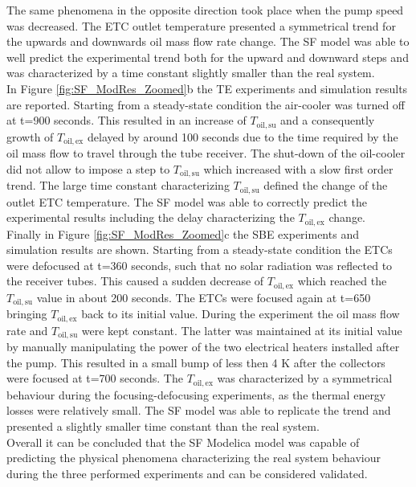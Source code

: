 \documentclass[final,3p,times,review]{elsarticle}
\begin{document}
The same phenomena in the opposite direction took place when the pump speed was decreased. 
The ETC outlet temperature presented a symmetrical trend for the upwards and downwards oil mass flow rate change. The SF model was able to well predict the experimental trend both for the upward and downward steps and was characterized by a time constant slightly smaller than the real system.\\
In Figure \ref{fig:SF_ModRes_Zoomed}b the TE experiments and simulation results are reported. Starting from a steady-state condition the air-cooler was turned off at t=900 seconds. This resulted in an increase of $T_\mathrm{oil,su}$ and a consequently growth of $T_\mathrm{oil,ex}$ delayed by around 100 seconds due to the time required by the oil mass flow to travel through the tube receiver. The shut-down of the oil-cooler did not allow to impose a step to $T_\mathrm{oil,su}$ which increased with a slow first order trend. The large time constant characterizing $T_\mathrm{oil,su}$ defined the change of the outlet ETC temperature. The SF model was able to correctly predict the experimental results including  the delay characterizing the $T_\mathrm{oil,ex}$ change.\\
Finally in Figure \ref{fig:SF_ModRes_Zoomed}c the SBE experiments and simulation results are shown. Starting from a steady-state condition the ETCs were defocused at t=360 seconds, such that no solar radiation was reflected to the receiver tubes. This caused a sudden decrease of $T_\mathrm{oil,ex}$ which reached the $T_\mathrm{oil,su}$ value in about 200 seconds. The ETCs were focused again at t=650 bringing $T_\mathrm{oil,ex}$ back to its initial value. During the experiment the oil mass flow rate and $T_\mathrm{oil,su}$ were kept constant. The latter was maintained at its initial value by manually manipulating the power of the two electrical heaters installed after the pump. This resulted in a small bump of less then 4 K after the collectors were focused at t=700 seconds. The $T_\mathrm{oil,ex}$ was characterized by a symmetrical behaviour during the focusing-defocusing experiments, as the thermal energy losses were relatively small. The SF model was able to replicate the trend and presented a slightly smaller time constant than the real system.\\
Overall it can be concluded that the SF Modelica model was capable of predicting the physical phenomena characterizing the real system behaviour during the three performed experiments and can be considered validated.
\end{document}
